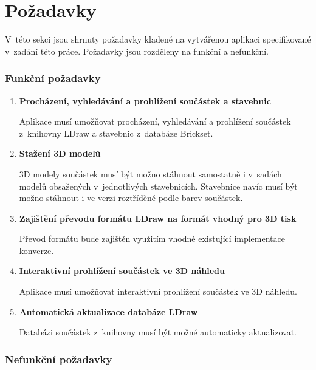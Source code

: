 \chapter{Požadavky}\label{kapitola-pozadavky}
V~této sekci jsou shrnuty požadavky kladené na vytvářenou aplikaci specifikované v~zadání této práce. Požadavky jsou rozděleny na funkční a nefunkční.

\subsection{Funkční požadavky}

\begin{enumerate}[label=FP-\arabic*]
    \item \label{fp:model:search} \textbf{Procházení, vyhledávání a prohlížení součástek a stavebnic}

    Aplikace musí umožňovat procházení, vyhledávání a prohlížení součástek z~knihovny LDraw a stavebnic z~databáze Brickset. 

    \item \label{fp:model:download} \textbf{Stažení 3D modelů}

    3D modely součástek musí být možno stáhnout samostatně i v~sadách modelů obsažených v~jednotlivých stavebnicích. Stavebnice navíc musí být možno stáhnout i ve verzi roztříděné podle barev součástek.

    \item \label{fp:model:prevod} \textbf{Zajištění převodu formátu LDraw na formát vhodný pro 3D tisk}

    Převod formátu bude zajištěn využitím vhodné existující implementace konverze. 

    \item \label{fp:model:3Dview} \textbf{Interaktivní prohlížení součástek ve 3D náhledu}

    Aplikace musí umožňovat interaktivní prohlížení součástek ve 3D náhledu.

    \item \label{fp:model:update} \textbf{Automatická aktualizace databáze LDraw}

    Databázi součástek z~knihovny musí být možné automaticky aktualizovat.

\end{enumerate}

\subsection{Nefunkční požadavky}

